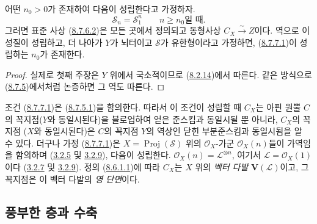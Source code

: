 \begin{corollary}[8.7.7]
\label{II.8.7.7-ko}
어떤 $n_0>0$가 존재하여 다음이 성립한다고 가정하자.
\begin{equation}
\label{II.8.7.7.1-ko}
  \mathcal{S}_n=\mathcal{S}_1^n
  \qquad\text{$n\geqslant n_0$일 때}.
\tag{8.7.7.1}
\end{equation}
그러면 표준 사상 (\hyperref[II.8.7.6.2-ko]{8.7.6.2})은 모든 곳에서
정의되고 동형사상 $C_X\xrightarrow{\sim}Z$이다. 역으로 이 성질이
성립하고, 더 나아가 $Y$가 뇌터이고 $\mathcal{S}$가 유한형이라고
가정하면, (\hyperref[II.8.7.7.1-ko]{8.7.7.1})이 성립하는 $n_0$가
존재한다.
\end{corollary}

\begin{proof}
실제로 첫째 주장은 $Y$ 위에서 국소적이므로
(\hyperref[II.8.2.14-ko]{8.2.14})에서 따른다. 같은 방식으로
(\hyperref[II.8.7.5-ko]{8.7.5})에서처럼 논증하면 그 역도 따른다.
\end{proof}

\begin{remark}[8.7.8]
\label{II.8.7.8-ko}
조건 (\hyperref[II.8.7.7.1-ko]{8.7.7.1})은
(\hyperref[II.8.7.5.1-ko]{8.7.5.1})을 함의한다. 따라서 이 조건이
성립할 때 $C_X$는 아핀 원뿔 $C$의 꼭지점($Y$와 동일시된다)을
블로업하여 얻은 준스킴과 동일시될 뿐 아니라, $C_X$의 꼭지점
($X$와 동일시된다)은 $C$의 꼭지점 $Y$의 역상인 닫힌 부분준스킴과
동일시됨을 알 수 있다. 더구나 가정
(\hyperref[II.8.7.7.1-ko]{8.7.7.1})은
$X=\operatorname{Proj}(\mathcal{S})$ 위의 $\mathcal{O}_X$-가군
$\mathcal{O}_X(n)$들이 가역임을 함의하며
(\hyperref[II.3.2.5-ko]{3.2.5} 및
\hyperref[II.3.2.9-ko]{3.2.9}), 다음이 성립한다.
$\mathcal{O}_X(n)=\mathcal{L}^{\otimes n}$, 여기서
$\mathcal{L}=\mathcal{O}_X(1)$이다
(\hyperref[II.3.2.7-ko]{3.2.7} 및
\hyperref[II.3.2.9-ko]{3.2.9}). 정의
(\hyperref[II.8.6.1.1-ko]{8.6.1.1})에 따라 $C_X$는 $X$ 위의
\emph{벡터 다발} $\mathbf{V}(\mathcal{L})$이고, 그 꼭지점은 이
벡터 다발의 \emph{영 단면}이다.
\end{remark}

\subsection{풍부한 층과 수축}
\label{subsection:II.8.8-ko}

